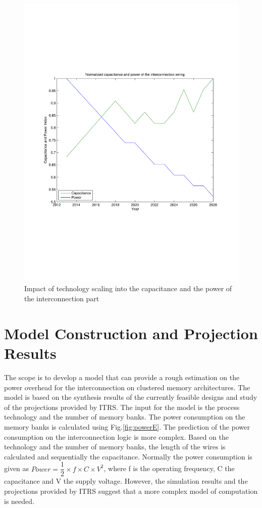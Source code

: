  \begin{figure}
 \centering
 \includegraphics[width = \textwidth]{E/intpower.pdf}
  \caption{Impact of technology scaling into the capacitance and the power of the interconnection part}
 \label{fig:intpowerE}
 \end{figure}


\section{Model Construction and Projection Results}

 The scope is to develop a model that can provide a rough estimation on the power overhead for the interconnection on clustered memory architectures.
 The model is based on the synthesis results of the currently feasible designs and study of the projections provided by ITRS.
 The input for the model is the process technology and the number of memory banks.
 The power consumption on the memory banks is calculated using Fig.\ref{fig:powerE}.
  The prediction of the power consumption on the interconnection logic is more complex.
 Based on the technology and the number of memory banks, the length of the wires is calculated and sequentially the capacitance.
 Normally the power consumption is given as  $Power = \dfrac{1}{2} \times f \times C \times V^{2} $, where  f is the operating frequency, C the capacitance and V the supply voltage.
 However, the simulation results and the projections provided by ITRS suggest that a more complex model of computation is needed.
 
